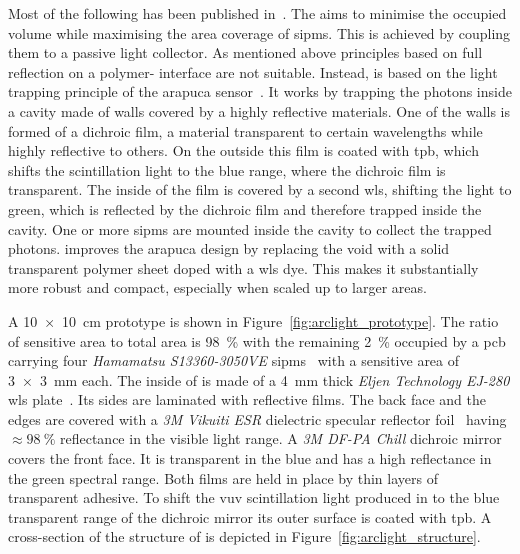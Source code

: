 Most of the following has been published in~\cite{arclight}.
The \AL{} aims to minimise the occupied volume while maximising the area coverage of \glspl{sipm}.
This is achieved by coupling them to a passive light collector.
As mentioned above principles based on full reflection on a polymer-\lar{} interface are not suitable.
Instead, \AL{} is based on the light trapping principle of the \gls{arapuca} sensor~\cite{arapuca}.
It works by trapping the photons inside a cavity made of walls covered by a highly reflective materials.
One of the walls is formed of a dichroic film, a material transparent to certain wavelengths while highly reflective to others.
On the outside this film is coated with \gls{tpb}, which shifts the \lar{} scintillation light to the blue range, where the dichroic film is transparent.
The inside of the film is covered by a second \gls{wls}, shifting the light to green, which is reflected by the dichroic film and therefore trapped inside the cavity.
One or more \glspl{sipm} are mounted inside the cavity to collect the trapped photons.
\AL{} improves the \gls{arapuca} design by replacing the void with a solid transparent polymer sheet doped with a \gls{wls} dye.
This makes it substantially more robust and compact, especially when scaled up to larger areas.

A \SI{10 x 10}{\centi\metre} \AL{} prototype is shown in Figure~\ref{fig:arclight_prototype}.
The ratio of sensitive area to total area is \SI{98}{\percent} with the remaining \SI{2}{\percent} occupied by a \gls{pcb} carrying four \emph{Hamamatsu S13360-3050VE} \glspl{sipm}~\cite{arclight_sipm} with a sensitive area of \SI{3 x 3}{\milli\metre} each.
The inside of \AL{} is made of a \SI{4}{\milli\metre} thick \emph{Eljen Technology EJ-280} \gls{wls} plate~\cite{arclight_wls}.
Its sides are laminated with reflective films.
The back face and the edges are covered with a \emph{3M Vikuiti ESR} dielectric specular reflector foil~\cite{arclight_esr} having $\approx \SI{98}{\percent}$ reflectance in the visible light range.
A \emph{3M DF-PA Chill} dichroic mirror~\cite{arclight_dichroic} covers the front face.
It is transparent in the blue and has a high reflectance in the green spectral range.
Both films are held in place by thin layers of transparent adhesive.
To shift the \gls{vuv} scintillation light produced in \lar{} to the blue transparent range of the dichroic mirror its outer surface is coated with \gls{tpb}.
A cross-section of the structure of \AL{} is depicted in Figure~\ref{fig:arclight_structure}.

